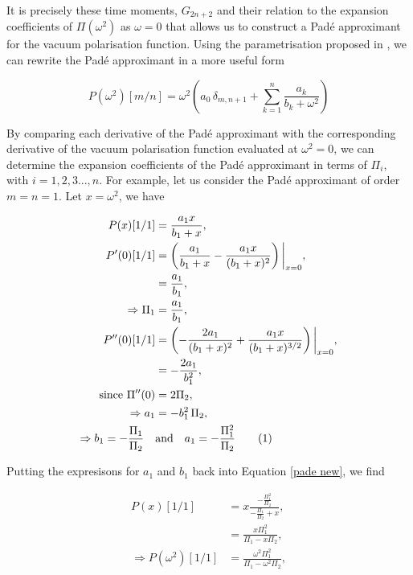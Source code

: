 \documentclass{article}
\numberwithin{equation}{section} %
\begin{document}
It is precisely these time moments, $G_{2n+2}$ and their relation to the expansion coefficients of $\Pi(\omega^2)$ as $\omega=0$ that allows us to construct a Pad\'e approximant for the vacuum polarisation function. Using the parametrisation proposed in \cite{pade2}, we can rewrite the Pad\'e approximant in a more useful form 

\begin{equation}
P(\omega^2)[m/n] = \omega^2\left( a_0\,\delta_{m,n+1} + \sum_{k=1}^n \frac{a_k}{b_k + \omega^2} \right)
\label{pade new}
\end{equation}

By comparing each derivative of the Pad\'e approximant with the corresponding derivative of the vacuum polarisation function evaluated at $\omega^2=0$, we can determine the expansion coefficients of the Pad\'e approximant in terms of $\Pi_i$, with $i=1,2,3...,n$. For example, let us consider the Pad\'e approximant of order $m=n=1$. Let $x=\omega^2$, we have 

\begin{align*}
P(x)[1/1] &= \frac{a_1x}{b_1+x},\\
P'(0)[1/1]&= \left(\frac{a_1}{b_1+x} - \frac{a_1x}{(b_1+x)^2}\right)\bigg\vert_{x=0},\\
&= \frac{a_1}{b_1},\\
\Rightarrow \Pi_1 &= \frac{a_1}{b_1},\\
P''(0)[1/1]&= \left(-\frac{2a_1}{(b_1+x)^2} + \frac{a_1x}{(b_1+x)^{3/2}}\right)\bigg\vert_{x=0},\\
&=-\frac{2a_1}{b_1^2},\\
\mathrm{since}\,\,\Pi''(0) &= 2\Pi_2,\\
\Rightarrow a_1 &= -b_1^2\,\Pi_2,\\
\Rightarrow b_1 = -\frac{\Pi_1}{\Pi_2} \quad &\mathrm{and} \quad a_1 = -\frac{\Pi_1^2}{\Pi_2}
\tag{\refstepcounter{equation}\theequation}
\end{align*}

\noindent Putting the expresisons for $a_1$ and $b_1$ back into Equation \ref{pade new}, we find

\begin{equation}
\begin{split}
P(x)[1/1] &= x \frac{-\frac{\Pi_1^2}{\Pi_2}}{-\frac{\Pi_1}{\Pi_2}+x},\\
&= \frac{x\Pi_1^2}{\Pi_1-x\Pi_2},\\
\Rightarrow P(\omega^2)[1/1]&= \frac{\omega^2\Pi_1^2}{\Pi_1-\omega^2\Pi_2},\\
\end{split}
\label{pade 11}
\end{equation}
\end{document}

